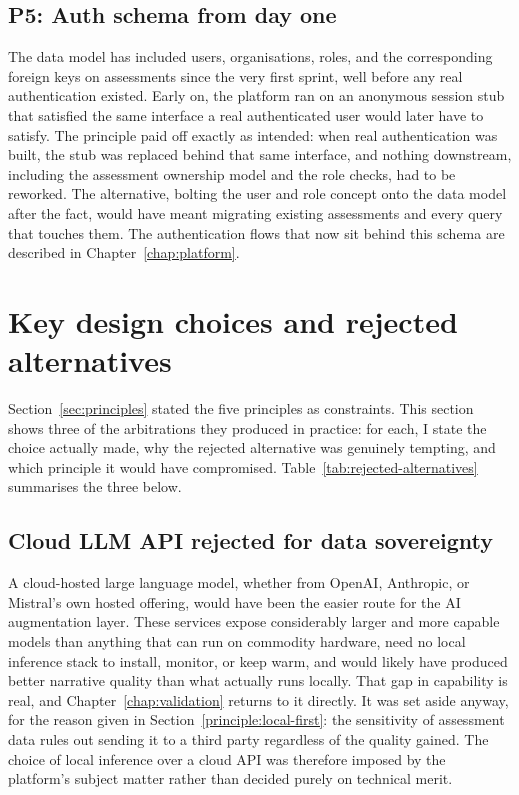 \subsection{P5: Auth schema from day one}
\label{principle:auth-schema}

The data model has included users, organisations, roles, and the
corresponding foreign keys on assessments since the very first sprint,
well before any real authentication existed. Early on, the platform ran on
an anonymous session stub that satisfied the same interface a real
authenticated user would later have to satisfy. The principle paid off
exactly as intended: when real authentication was built, the stub was
replaced behind that same interface, and nothing downstream, including the
assessment ownership model and the role checks, had to be reworked. The
alternative, bolting the user and role concept onto the data model after
the fact, would have meant migrating existing assessments and every query
that touches them. The authentication flows that now sit behind this
schema are described in Chapter~\ref{chap:platform}.

\section{Key design choices and rejected alternatives}
\label{sec:design-choices}

Section~\ref{sec:principles} stated the five principles as constraints.
This section shows three of the arbitrations they produced in practice:
for each, I state the choice actually made, why the rejected alternative
was genuinely tempting, and which principle it would have compromised.
Table~\ref{tab:rejected-alternatives} summarises the three below.

\subsection{Cloud LLM API rejected for data sovereignty}

A cloud-hosted large language model, whether from OpenAI, Anthropic, or
Mistral's own hosted offering, would have been the easier route for the AI
augmentation layer. These services expose considerably larger and more
capable models than anything that can run on commodity hardware, need no
local inference stack to install, monitor, or keep warm, and would likely
have produced better narrative quality than what actually runs locally.
That gap in capability is real, and Chapter~\ref{chap:validation} returns to
it directly. It was set aside anyway, for the reason given in
Section~\ref{principle:local-first}: the sensitivity of assessment data rules
out sending it to a third party regardless of the quality gained. The choice of 
local inference over a cloud API was therefore imposed by the platform's subject 
matter rather than decided purely on technical merit.

